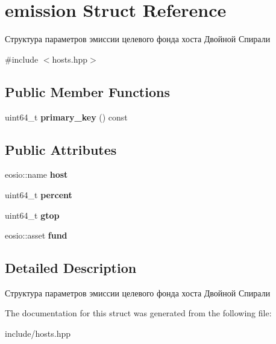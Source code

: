 \hypertarget{structemission}{}\section{emission Struct Reference}
\label{structemission}


Структура параметров эмиссии целевого фонда хоста Двойной Спирали  




{\ttfamily \#include $<$hosts.\+hpp$>$}

\subsection*{Public Member Functions}
\begin{DoxyCompactItemize}
\item 
\mbox{\label{structemission_a3b8f921b625966c1af4f8f346247f58a}} 
uint64\+\_\+t {\bfseries primary\+\_\+key} () const
\end{DoxyCompactItemize}
\subsection*{Public Attributes}
\begin{DoxyCompactItemize}
\item 
\mbox{\label{structemission_a50f41aa67f2ebcedbaad90618ece068b}} 
eosio\+::name {\bfseries host}
\item 
\mbox{\label{structemission_a90a071303b94d463f402fea47b624a3e}} 
uint64\+\_\+t {\bfseries percent}
\item 
\mbox{\label{structemission_a4000c3453e37c4414832ad05111b05f1}} 
uint64\+\_\+t {\bfseries gtop}
\item 
\mbox{\label{structemission_a4b716d4513ce0c923116c020cede0384}} 
eosio\+::asset {\bfseries fund}
\end{DoxyCompactItemize}


\subsection{Detailed Description}
Структура параметров эмиссии целевого фонда хоста Двойной Спирали 

The documentation for this struct was generated from the following file\+:\begin{DoxyCompactItemize}
\item 
include/hosts.\+hpp\end{DoxyCompactItemize}
